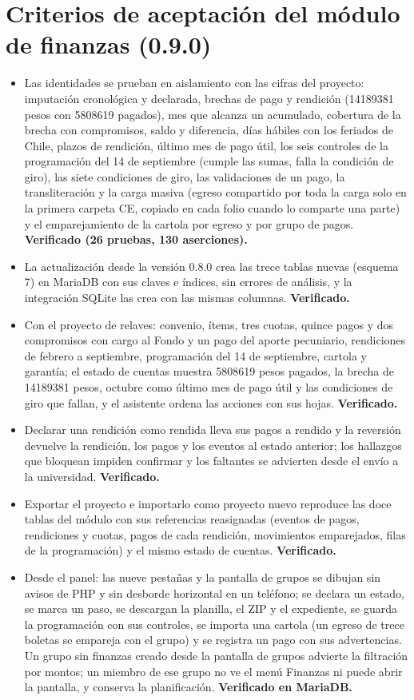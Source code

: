 \documentclass[11pt,a4paper]{article}
\begin{document}
\section{Criterios de aceptación del módulo de finanzas (0.9.0)}

\begin{itemize}
\item Las identidades se prueban en aislamiento con las cifras del proyecto: imputación cronológica y declarada, brechas de pago y rendición (\num{14189381} pesos con \num{5808619} pagados), mes que alcanza un acumulado, cobertura de la brecha con compromisos, saldo y diferencia, días hábiles con los feriados de Chile, plazos de rendición, último mes de pago útil, los seis controles de la programación del 14 de septiembre (cumple las sumas, falla la condición de giro), las siete condiciones de giro, las validaciones de un pago, la transliteración y la carga masiva (egreso compartido por toda la carga solo en la primera carpeta CE, copiado en cada folio cuando lo comparte una parte) y el emparejamiento de la cartola por egreso y por grupo de pagos. \textbf{Verificado (26 pruebas, 130 aserciones).}
\item La actualización desde la versión 0.8.0 crea las trece tablas nuevas (esquema 7) en MariaDB con sus claves e índices, sin errores de análisis, y la integración SQLite las crea con las mismas columnas. \textbf{Verificado.}
\item Con el proyecto de relaves: convenio, ítems, tres cuotas, quince pagos y dos compromisos con cargo al Fondo y un pago del aporte pecuniario, rendiciones de febrero a septiembre, programación del 14 de septiembre, cartola y garantía; el estado de cuentas muestra \num{5808619} pesos pagados, la brecha de \num{14189381} pesos, octubre como último mes de pago útil y las condiciones de giro que fallan, y el asistente ordena las acciones con sus hojas. \textbf{Verificado.}
\item Declarar una rendición como rendida lleva sus pagos a rendido y la reversión devuelve la rendición, los pagos y los eventos al estado anterior; los hallazgos que bloquean impiden confirmar y los faltantes se advierten desde el envío a la universidad. \textbf{Verificado.}
\item Exportar el proyecto e importarlo como proyecto nuevo reproduce las doce tablas del módulo con sus referencias reasignadas (eventos de pagos, rendiciones y cuotas, pagos de cada rendición, movimientos emparejados, filas de la programación) y el mismo estado de cuentas. \textbf{Verificado.}
\item Desde el panel: las nueve pestañas y la pantalla de grupos se dibujan sin avisos de PHP y sin desborde horizontal en un teléfono; se declara un estado, se marca un paso, se descargan la planilla, el ZIP y el expediente, se guarda la programación con sus controles, se importa una cartola (un egreso de trece boletas se empareja con el grupo) y se registra un pago con sus advertencias. Un grupo sin finanzas creado desde la pantalla de grupos advierte la filtración por montos; un miembro de ese grupo no ve el menú Finanzas ni puede abrir la pantalla, y conserva la planificación. \textbf{Verificado en MariaDB.}
\end{itemize}
\end{document}
